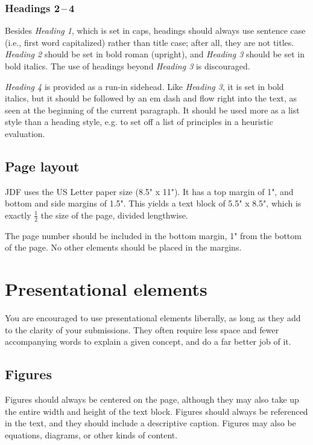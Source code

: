 \documentclass[
	letterpaper, %
]{jdf}
\begin{document}
\subsubsection{Headings 2\,–\,4}
Besides \emph{Heading 1}, which is set in caps, headings should always use sentence case (i.e., first word capitalized) rather than title case; after all, they are not titles. \emph{Heading 2} should be set in bold roman (upright), and \emph{Heading 3} should be set in bold italics. The use of headings beyond \emph{Heading 3} is discouraged.

\emph{Heading 4} is provided as a run-in sidehead. Like \emph{Heading 3}, it is set in bold italics, but it should be followed by an em dash and flow right into the text, as seen at the beginning of the current paragraph. It should be used more as a list style than a heading style, e.g. to set off a list of principles in a heuristic evaluation.

\subsection{Page layout}
JDF uses the US Letter paper size (8.5" x 11"). It has a top margin of 1", and bottom and side margins of 1.5". This yields a text block of 5.5" x 8.5", which is exactly \(\frac{1}{2}\) the size of the page, divided lengthwise.

The page number should be included in the bottom margin, 1" from the bottom of the page. No other elements should be placed in the margins.

\section{Presentational elements}
You are encouraged to use presentational elements liberally, as long as they add to the clarity of your submissions. They often require less space and fewer accompanying words to explain a given concept, and do a far better job of it.

\subsection{Figures}
Figures should always be centered on the page, although they may also take up the entire width and height of the text block. Figures should always be referenced in the text, and they should include a descriptive caption. Figures may also be equations, diagrams, or other kinds of content.
\end{document}
